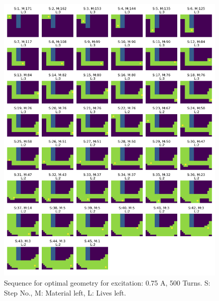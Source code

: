 \begin{figure}
    \centering
    \includegraphics[width=\textwidth]{Figures/Ch_RL/0.75_Count179_NetForce32.7.png}
    \caption{Sequence for optimal geometry for excitation: 0.75 A, 500 Turns. S: Step No., M: Material left, L: Lives left.}
    \label{fig:RL_Ccore_0.75A_sequence}
\end{figure}

